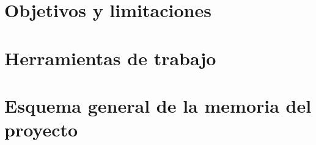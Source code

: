 \section{Objetivos y limitaciones}



\section{Herramientas de trabajo}


\section{Esquema general de la memoria del proyecto}









